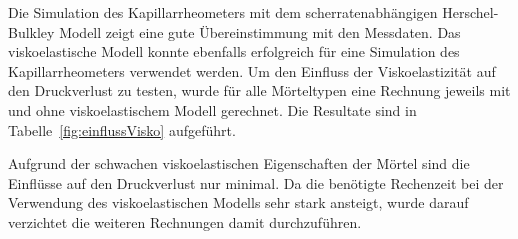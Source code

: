Die Simulation des Kapillarrheometers mit dem scherratenabhängigen \linebreak Herschel-Bulkley Modell zeigt eine gute Übereinstimmung mit den Messdaten.
Das viskoelastische Modell konnte ebenfalls erfolgreich für eine Simulation des Kapillarrheometers verwendet werden.
Um den Einfluss der Viskoelastizität auf den Druckverlust zu testen, wurde für alle Mörteltypen eine Rechnung jeweils mit und ohne viskoelastischem Modell gerechnet. Die Resultate sind in Tabelle~\ref{fig:einflussVisko} aufgeführt.
%
\begin{table}[bt]
\noindent{}
    \caption{Der Einfluss der Viskoelastizität auf den Druckverlust. In der oberen Zeile die Simulationen mit den rein scherratenabhängigen Modellen, unten mit berücksichtigter Viskoelastizität. Für die Simulation wurde das Kapillarrheometer mit 2mm Kapillare und einer Einlassgeschwindigkeit von 0.13mm/s verwendet.}
    \label{fig:einflussVisko}
\end{table}

Aufgrund der schwachen viskoelastischen Eigenschaften der Mörtel sind die Einflüsse auf den Druckverlust nur minimal. Da die benötigte Rechenzeit bei der Verwendung des viskoelastischen Modells sehr stark ansteigt, wurde darauf verzichtet die weiteren Rechnungen damit durchzuführen.
